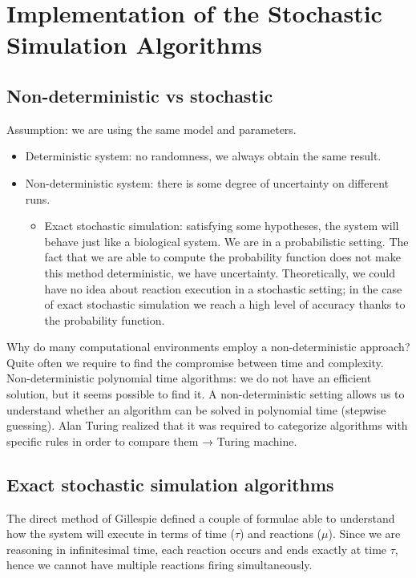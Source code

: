 \graphicspath{{chapters/03/images/}}
\chapter{Implementation of the Stochastic Simulation Algorithms}

\section{Non-deterministic vs stochastic}
Assumption: we are using the same model and parameters.

\begin{itemize}
  \item Deterministic system: no randomness, we always obtain the same result.
  \item Non-deterministic system: there is some degree of uncertainty on different runs.

  \begin{itemize}
    \item Exact stochastic simulation: satisfying some hypotheses, the system will behave just like a biological system.
      We are in a probabilistic setting.
      The fact that we are able to compute the probability function does not make this method deterministic, we have uncertainty.
      Theoretically, we could have no idea about reaction execution in a stochastic setting; in the case of exact stochastic simulation we reach a high level of accuracy thanks to the probability function.
  \end{itemize}
\end{itemize}

Why do many computational environments employ a non-deterministic approach? Quite often we require to find the compromise between time and complexity.
Non-deterministic polynomial time algorithms: we do not have an efficient solution, but it seems possible to find it.
A non-deterministic setting allows us to understand whether an algorithm can be solved in polynomial time (stepwise guessing).
Alan Turing realized that it was required to categorize algorithms with specific rules in order to compare them → Turing machine.

\section{Exact stochastic simulation algorithms}
The direct method of Gillespie defined a couple of formulae able to understand how the system will execute in terms of time ($\tau$) and reactions ($\mu$).
Since we are reasoning in infinitesimal time, each reaction occurs and ends exactly at time $\tau$, hence we cannot have multiple reactions firing simultaneously.

